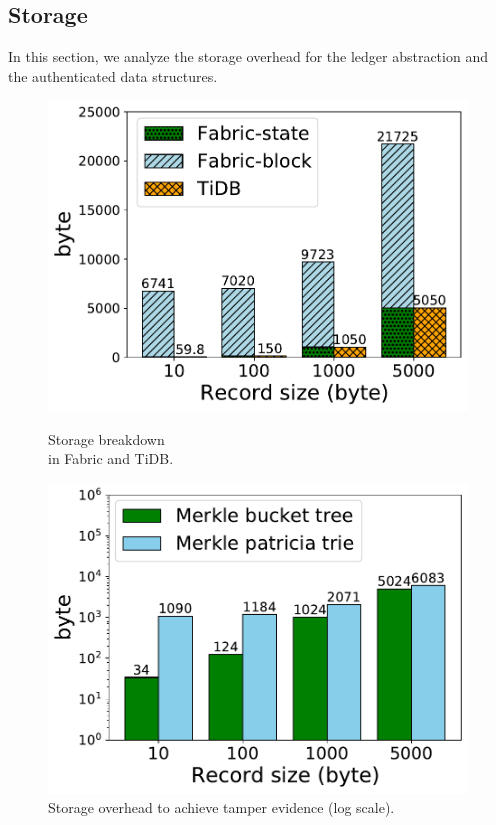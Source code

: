 \subsection{Storage}
\label{ch:twin:exp:storage}
In this section, we analyze the storage overhead for the ledger abstraction and
the authenticated data structures.

\begin{figure}[tp]
	\begin{minipage}{0.45\textwidth}
		\centering
		\includegraphics[width=0.99\textwidth]{chart/twin/record-size-storage.pdf}
		\caption{Storage breakdown \\ in Fabric and TiDB.}
		\label{chart:twin:record-size-storage}
	\end{minipage}\hfill
	\begin{minipage}{0.45\textwidth}
		\centering
		\includegraphics[width=0.99\textwidth]{chart/twin/record-size-antitamper.pdf}
		\caption{Storage overhead to achieve tamper evidence (log scale).}
		\label{chart:twin:record-size-antitamper}
	\end{minipage}\hfill
 \end{figure}

